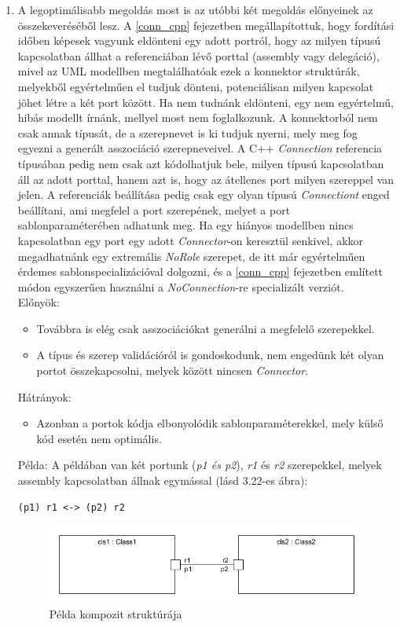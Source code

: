 \documentclass[a4paper,12pt]{report}
\begin{document}
\begin{enumerate}
\item A legoptimálisabb megoldás most is az utóbbi két megoldás előnyeinek az összekeveréséből lesz. A \ref{conn_cpp} fejezetben megállapítottuk, hogy fordítási időben képesek vagyunk eldönteni egy adott portról, hogy az milyen típusú kapcsolatban állhat a referenciában lévő porttal (assembly vagy delegáció), mivel az UML modellben megtalálhatóak ezek a konnektor struktúrák, melyekből egyértelműen el tudjuk dönteni, potenciálisan milyen kapcsolat jöhet létre a két port között. Ha nem tudnánk eldönteni, egy nem egyértelmű, hibás modellt írnánk, mellyel most nem foglalkozunk. A konnektorból nem csak annak típusát, de a szerepnevet is ki tudjuk nyerni, mely meg fog egyezni a generált asszociáció szerepneveivel. A C++ \textit{Connection} referencia típusában pedig nem csak azt kódolhatjuk bele, milyen típusú kapcsolatban áll az adott porttal, hanem azt is, hogy az átellenes port milyen szereppel van jelen. A referenciák beállítása pedig csak egy olyan típusú \textit{Connectiont} enged beállítani, ami megfelel a port szerepének,  melyet a  port sablonparaméterében adhatunk meg. Ha egy hiányos modellben nincs kapcsolatban egy port egy adott \textit{Connector}-on keresztül senkivel, akkor megadhatnánk egy extremális \textit{NoRole} szerepet, de itt már egyértelműen érdemes sablonspecializációval dolgozni, és a \ref{conn_cpp} fejezetben említett módon egyszerűen használni a \textit{NoConnection}-re specializált verziót.  \\
Előnyök:
\begin{itemize}
\item Továbbra is elég csak asszociációkat generálni a megfelelő szerepekkel.
\item A típus és szerep validációról is gondoskodunk, nem engedünk két olyan portot összekapcsolni, melyek között nincsen \textit{Connector}.
\end{itemize}
Hátrányok:
\begin{itemize}
\item Azonban a portok kódja elbonyolódik sablonparaméterekkel, mely külső kód esetén nem optimális.
\end{itemize}
Példa:
A példában van két portunk (\textit{p1 és p2}), \textit{r1} és \textit{r2} szerepekkel, melyek assembly kapcsolatban állnak egymással (lásd 3.22-es ábra):
\begin{lstlisting}
(p1) r1 <-> (p2) r2
\end{lstlisting}

\begin{figure}[H]
\begin{center}
\includegraphics[scale=0.6]{conn_role_comp.png}
\end{center}
\caption{Példa kompozit struktúrája}
\end{figure} 


\end{enumerate}
\end{document}

